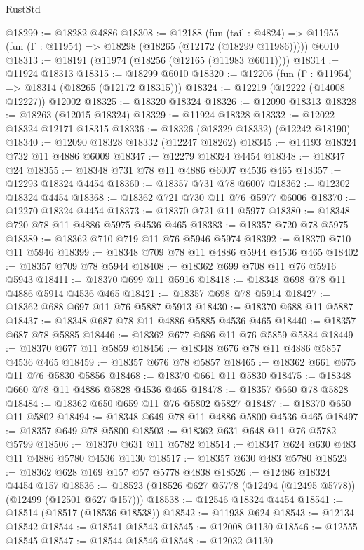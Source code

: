 \begin{lexlean}{RustStd}
\begin{coremodule}
@18299 := @18282 @4886
@18308 := @12188
    (fun (tail : @4824) => @11955 (fun (Γ : @11954) => @18298 (@18265 (@12172 (@18299 @11986)))))
    @6010
@18313 := @18191 (@11974 (@18256 (@12165 (@11983 @6011))))
@18314 := @11924 @18313
@18315 := @18299 @6010
@18320 := @12206 (fun (Γ : @11954) => @18314 (@18265 (@12172 @18315)))
@18324 := @12219 (@12222 (@14008 @12227)) @12002
@18325 := @18320 @18324
@18326 := @12090 @18313
@18328 := @18263 (@12015 @18324)
@18329 := @11924 @18328
@18332 := @12022 @18324 @12171 @18315
@18336 := @18326 (@18329 @18332) (@12242 @18190)
@18340 := @12090 @18328 @18332 (@12247 @18262)
@18345 := @14193 @18324 @732 @11 @4886 @6009
@18347 := @12279 @18324 @4454
@18348 := @18347 @24
@18355 := @18348 @731 @78 @11 @4886 @6007 @4536 @465
@18357 := @12293 @18324 @4454
@18360 := @18357 @731 @78 @6007
@18362 := @12302 @18324 @4454
@18368 := @18362 @721 @730 @11 @76 @5977 @6006
@18370 := @12270 @18324 @4454
@18373 := @18370 @721 @11 @5977
@18380 := @18348 @720 @78 @11 @4886 @5975 @4536 @465
@18383 := @18357 @720 @78 @5975
@18389 := @18362 @710 @719 @11 @76 @5946 @5974
@18392 := @18370 @710 @11 @5946
@18399 := @18348 @709 @78 @11 @4886 @5944 @4536 @465
@18402 := @18357 @709 @78 @5944
@18408 := @18362 @699 @708 @11 @76 @5916 @5943
@18411 := @18370 @699 @11 @5916
@18418 := @18348 @698 @78 @11 @4886 @5914 @4536 @465
@18421 := @18357 @698 @78 @5914
@18427 := @18362 @688 @697 @11 @76 @5887 @5913
@18430 := @18370 @688 @11 @5887
@18437 := @18348 @687 @78 @11 @4886 @5885 @4536 @465
@18440 := @18357 @687 @78 @5885
@18446 := @18362 @677 @686 @11 @76 @5859 @5884
@18449 := @18370 @677 @11 @5859
@18456 := @18348 @676 @78 @11 @4886 @5857 @4536 @465
@18459 := @18357 @676 @78 @5857
@18465 := @18362 @661 @675 @11 @76 @5830 @5856
@18468 := @18370 @661 @11 @5830
@18475 := @18348 @660 @78 @11 @4886 @5828 @4536 @465
@18478 := @18357 @660 @78 @5828
@18484 := @18362 @650 @659 @11 @76 @5802 @5827
@18487 := @18370 @650 @11 @5802
@18494 := @18348 @649 @78 @11 @4886 @5800 @4536 @465
@18497 := @18357 @649 @78 @5800
@18503 := @18362 @631 @648 @11 @76 @5782 @5799
@18506 := @18370 @631 @11 @5782
@18514 := @18347 @624 @630 @483 @11 @4886 @5780 @4536 @1130
@18517 := @18357 @630 @483 @5780
@18523 := @18362 @628 @169 @157 @57 @5778 @4838
@18526 := @12486 @18324 @4454 @157
@18536 := @18523 (@18526 @627 @5778 (@12494 (@12495 @5778)) (@12499 (@12501 @627 @157)))
@18538 := @12546 @18324 @4454
@18541 := @18514 (@18517 (@18536 @18538))
@18542 := @11938 @624
@18543 := @12134 @18542
@18544 := @18541 @18543
@18545 := @12008 @1130
@18546 := @12555 @18545
@18547 := @18544 @18546
@18548 := @12032 @1130

\end{coremodule}
\end{lexlean}
